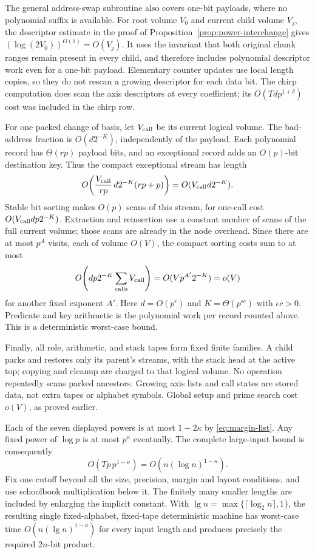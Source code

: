 The general address-swap subroutine also covers one-bit payloads,
where no polynomial suffix is available. For root volume $V_0$ and
current child volume $V_j$, the descriptor estimate in the proof of
Proposition~\ref{prop:power-interchange} gives
$(\log(2V_0))^{O(1)}=O(V_j)$. It uses the invariant that both original
chunk ranges remain present in every child, and therefore includes
polynomial descriptor work even for a one-bit payload.
Elementary counter updates use local length copies, so they do not
rescan a growing descriptor for each data bit.  The chirp computation
does scan the axis descriptors at every coefficient; its
$O(Tdp^{1+\delta})$ cost was included in the chirp row.

For one packed change of basis, let $V_{\rm call}$ be its current
logical volume.  The bad-address fraction is
$O(d2^{-K})$, independently of the payload.  Each polynomial record
has $\Theta(rp)$ payload bits, and an exceptional record adds an
$O(p)$-bit destination key.  Thus the compact exceptional stream has
length
\[
 O\!\left(\frac{V_{\rm call}}{rp}\,d2^{-K}(rp+p)\right)
   =O(V_{\rm call}d2^{-K}).
\]
Stable bit sorting makes $O(p)$ scans of this stream, for one-call
cost $O(V_{\rm call}dp2^{-K})$.  Extraction and reinsertion use a
constant number of scans of the full current volume; those scans are
already in the node overhead.  Since there are at most $p^A$ visits,
each of volume $O(V)$, the compact sorting costs sum to at most
\[
 O\!\left(dp2^{-K}\sum_{\rm calls}V_{\rm call}\right)
   =O(Vp^{A'}2^{-K})=o(V)
\]
for another fixed exponent $A'$.  Here $d=O(p^\epsilon)$ and
$K=\Theta(p^{\epsilon c})$ with $\epsilon c>0$.  Predicate and key
arithmetic is the polynomial work per record counted above.  This is
a deterministic worst-case bound.

Finally, all role, arithmetic, and stack tapes form fixed finite
families.  A child parks and restores only its parent's streams, with
the stack head at the active top; copying and cleanup are charged to
that logical volume.  No operation repeatedly scans parked ancestors.
Growing axis lists and call states are stored data, not extra tapes or
alphabet symbols.  Global setup and prime search cost $o(V)$, as
proved earlier.

Each of the seven displayed powers is at most $1-2\kappa$ by
\eqref{eq:margin-list}.  Any fixed power of $\log p$ is at most $p^\kappa$
eventually.  The complete large-input bound is consequently
\[
 O(Tp\,p^{1-\kappa})=O(n(\log n)^{1-\kappa}).
\]
Fix one cutoff beyond all the size, precision, margin and layout
conditions, and use schoolbook multiplication below it.  The finitely
many smaller lengths are included by enlarging the implicit constant.
With $\lg n=\max\{\lceil\log_2n\rceil,1\}$, the resulting single
fixed-alphabet, fixed-tape deterministic machine has worst-case time
$O(n(\lg n)^{1-\kappa})$ for every input length and produces precisely
the required $2n$-bit product.
